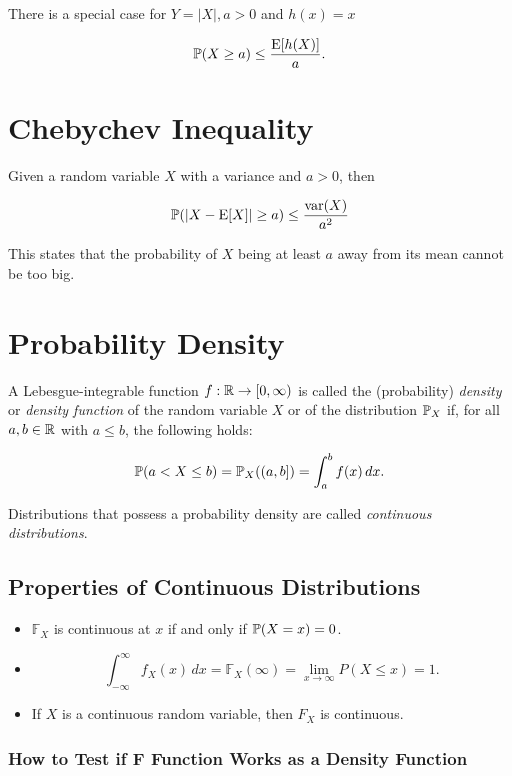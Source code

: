 There is a special case for \(Y = |X|, a > 0\) and \(h(x) = x\)

\[    
    \mathbb{P}(X \ge a) \le \frac{\mathrm{E}[h(X)]}{a}.
\]

\section{Chebychev Inequality}

Given a random variable \(X\) with a variance and \(a > 0\), then 

\[
    \mathbb{P}(|X - \mathrm{E}[X]| \ge a) \le \frac{\mathrm{var}(X)}{a^2}
\]

This states that the probability of \(X\) being at least \(a\) away from its mean cannot be too big.

\section{Probability Density}

A Lebesgue-integrable function \( f : \mathbb{R} \to [0, \infty) \) is called the (probability) \emph{density} or \emph{density function} of the random variable \( X \) or of the
distribution \( \mathbb{P}_X \) if, for all \( a, b \in \mathbb{R} \) with \( a \le b \), the following holds:

\[
    \mathbb{P}(a < X \le b) = \mathbb{P}_X((a, b]) = \int_a^b f(x)\,dx.
\]

Distributions that possess a probability density are called \emph{continuous distributions}.

\subsection{Properties of Continuous Distributions}

\begin{itemize}
	
    \item \(\mathbb{F}_X \) is continuous at \( x \) if and only if \( \mathbb{P}(X = x) = 0 \).

    \item 
	\[
	    \int_{-\infty}^{\infty} f_X(x)\,dx 
	    = \mathbb{F}_X(\infty) 
	    = \lim_{x \to \infty} P(X \le x) 
	    = 1.
	\]

    \item  If \( X \) is a continuous random variable, then \( F_X \) is continuous.

\end{itemize}

\subsubsection{How to Test if F Function Works as a Density Function}

